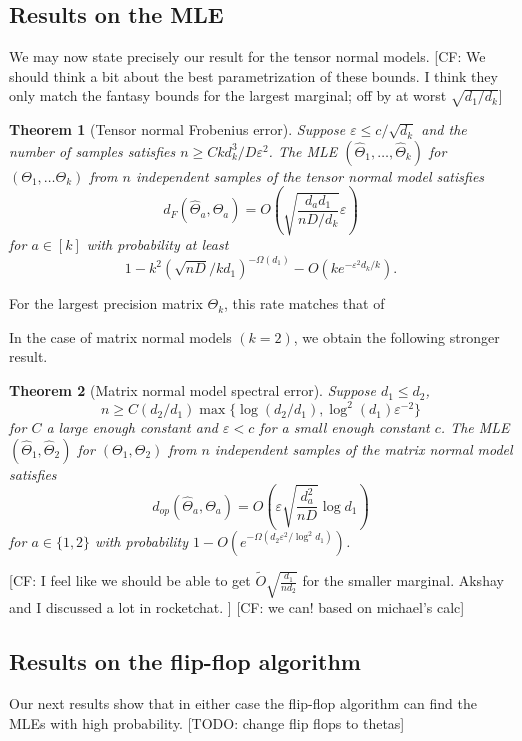 \documentclass[aos]{imsart}
\newtheorem{theorem}{Theorem}
\theoremstyle{definition}
\newcommand{\eps}{\varepsilon}
\newcommand{\CF}[1]{{\color{purple}[CF: #1]}}
\newcommand{\TODO}[1]{{\color{blue}[TODO: #1]}}
\begin{document}
\subsection{Results on the MLE}
We may now state precisely our result for the tensor normal models. \CF{We should think a bit about the best parametrization of these bounds. I think they only match the fantasy bounds for the largest marginal; off by at worst $\sqrt{d_1/d_k}$}
\begin{theorem}[Tensor normal Frobenius error]\label{thm:tensor-frobenius} Suppose $\eps \leq c/\sqrt{d_k}$ and the number of samples satisfies $n \geq C k d_k^3/D\eps^2$. The MLE $(\widehat{\Theta}_1, \dots, \widehat{\Theta}_k) $ for $(\Theta_1, \dots \Theta_k)$ from $n$ independent samples of the tensor normal model satisfies
$$ d_{F}(\widehat{\Theta}_a, \Theta_a) = O\left( \sqrt{\frac{d_a d_1}{n D/d_k}}\eps\right) $$
for $a \in [k]$ with probability at least
$$1 - k^2 \left(\sqrt{nD} / kd_1 \right)^{ - \Omega(d_1)} - O(k e^{ - \eps^2 d_k / k}).$$
\end{theorem}
For the largest precision matrix $\Theta_k$, this rate matches that of

 In the case of matrix normal models $(k=2)$, we obtain the following stronger result.

\begin{theorem}[Matrix normal model spectral error]\label{thm:matrix-normal} Suppose $d_1 \leq d_2$,
$$n \geq C (d_2/d_1) \max\{\log (d_2/d_1),  \log^2(d_1) \eps^{-2}\}$$ for $C$ a large enough constant and $\eps < c$ for a small enough constant $c$. The MLE $(\widehat{\Theta}_1,\widehat{\Theta}_2) $ for $(\Theta_1, \Theta_2)$ from $n$ independent samples of the matrix normal model satisfies
$$ d_{op}(\widehat{\Theta}_a, \Theta_a) = O\left(\eps \sqrt{\frac{d_a^2}{nD}} \log d_1\right) $$
for $a \in \{1,2\}$ with probability $1 - O(e^{ - \Omega( d_2 \eps^2/\log^2 d_1)})$.
\end{theorem}
\CF{I feel like we should be able to get $\tilde{O}\sqrt{\frac{d_1}{n d_2}}$ for the smaller marginal. Akshay and I discussed a lot in rocketchat. }
\CF{we can! based on michael's calc}

\subsection{Results on the flip-flop algorithm}
Our next results show that in either case the flip-flop algorithm can find the MLEs with high probability. \TODO{change flip flops to thetas}
\end{document}
